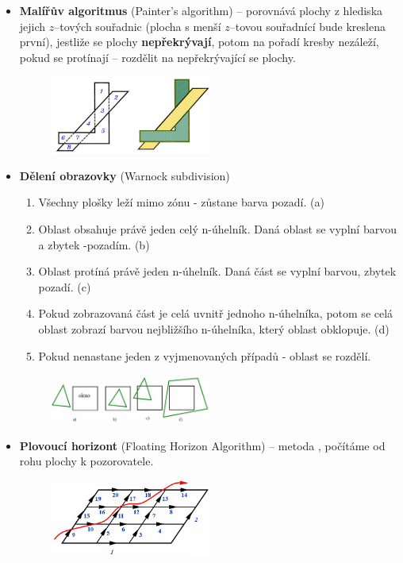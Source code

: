 \begin{itemize}
	\item \textbf{Malířův algoritmus} (Painter's algorithm) -- porovnává plochy z hlediska jejich $z$--tových souřadnic (plocha s menší $z$--tovou souřadnící bude kreslena první), jestliže se plochy \textbf{nepřekrývají}, potom na pořadí kresby nezáleží, pokud se protínají -- rozdělit na nepřekrývající se plochy.
		\begin{figure}[H]
		\centering
		\includegraphics[width=0.5\textwidth]{assets/5_malir}
		\end{figure}
	\item \textbf{Dělení obrazovky }(Warnock subdivision)
		\begin{enumerate}
				\item Všechny plošky leží mimo zónu - zůstane barva pozadí. (a) 
				\item Oblast obsahuje právě jeden celý n-úhelník. Daná oblast se vyplní barvou a zbytek -pozadím. (b) 
				\item Oblast protíná právě jeden n-úhelník. Daná část se vyplní barvou, zbytek pozadí. (c) 
				\item Pokud zobrazovaná část je celá uvnitř jednoho n-úhelníka, potom se celá oblast zobrazí barvou nejbližšího n-úhelníka, který oblast obklopuje. (d) 
				\item Pokud nenastane jeden z vyjmenovaných případů - oblast se rozdělí.
		\end{enumerate}
		\begin{figure}[H]
		\centering
		\includegraphics[width=0.5\textwidth]{assets/5_warnock}
		\end{figure}
	\item \textbf{Plovoucí horizont} (Floating Horizon Algorithm) -- metoda , počítáme od  rohu plochy k  pozorovatele.
		\begin{figure}[H]
		\centering
		\includegraphics[width=0.5\textwidth]{assets/5_horizont}

\end{figure}
\end{itemize}
